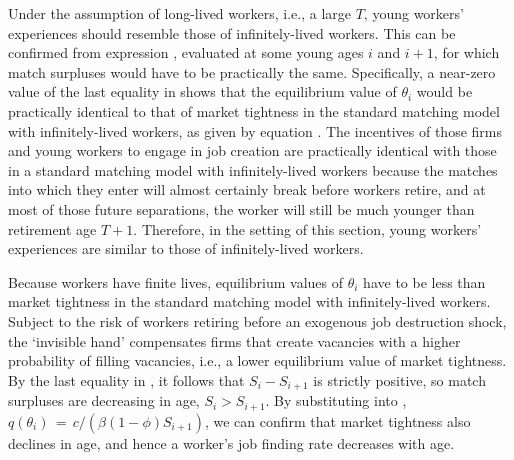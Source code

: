 Under the assumption of long-lived workers, i.e., a large $T$,
young workers' experiences should resemble  those of
infinitely-lived workers. This can be confirmed from expression
, evaluated at some young ages $i$ and $i+1$,
for which match surpluses would have to be practically the same.
Specifically, a near-zero value of the last equality
in  shows that the equilibrium value of
$\theta_i$ would be practically identical to that of market
tightness in the standard matching model with infinitely-lived
workers, as given by equation . The incentives of those firms and young workers
to engage in job creation are practically identical with those in a
standard matching model with infinitely-lived workers because the
matches into which they enter will almost certainly break before workers retire,
 and at most of those future separations, the
worker will  still be much younger than
retirement age $T+1$. Therefore, in the setting of this section, young workers' experiences are
similar to those of infinitely-lived workers.

Because workers have  finite lives,  equilibrium values of
$\theta_i$  have to be less than market tightness
in the standard matching model with infinitely-lived workers.
Subject to the risk of workers retiring before an exogenous
job destruction shock, the `invisible hand'
compensates firms that create vacancies with a higher probability
of filling vacancies, i.e., a lower equilibrium value of market
tightness. By the last equality in , it follows
that $S_i - S_{i+1}$ is strictly positive, so  match
surpluses are decreasing in age, $S_i > S_{i+1}$. By
substituting  into ,
$q(\theta_i)\,=\, c / (\beta (1-\phi) S_{i+1})$, we can
confirm that market tightness also declines
in age, and hence a worker's job finding rate  decreases with
age.

